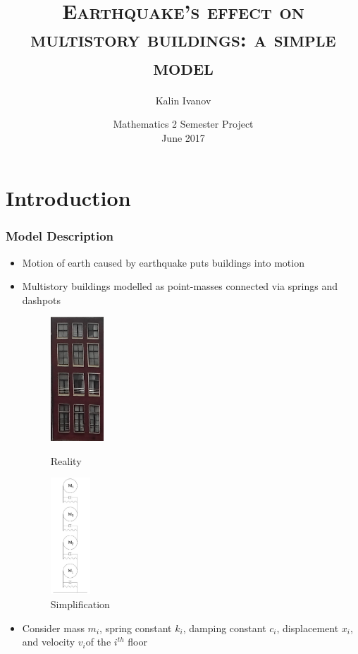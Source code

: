 \documentclass[xcolor=svgnames,9pt]{beamer}
\title[EQ's effect on multistory buildings]
{\textsc{Earthquake's effect on multistory buildings: a simple model}}
\institute[]{\large \textsc{\v{C}VUT FSv}}
\author[Kalin Ivanov]
{Kalin Ivanov}
\date[15 June 2017]
{Mathematics 2 Semester Project
\\
\bigskip
15 June 2017}
\theoremstyle{remark}
\begin{document}
		\begin{frame}
  			\titlepage
		\end{frame}
	\section{Introduction}
		\begin{frame}
			\frametitle{Model Description}
			\begin{itemize}
				\item Motion of earth caused by earthquake puts buildings into motion
				\item Multistory buildings modelled as point-masses connected via springs and dashpots

				\begin{figure}
 				 	\begin{minipage}[b]{0.4\textwidth}
						\centering
    						\includegraphics[width=20mm]{bldg.png}
    						\caption{Reality}
						\label{bldg}
  					\end{minipage}
 					 \hfill
					\begin{minipage}[b]{0.4\textwidth}
						\centering
 				  	 	\includegraphics[width=15mm]{SPRINGS-Model1A.jpg}
    						\caption{Simplification}
						\label{Springs1}
 					 \end{minipage}
				\end{figure}

				\item Consider mass $m_i$, spring constant $k_i$, damping constant $c_i$, displacement $x_i$,  and velocity $v_i$of the $i^{th}$ floor
			\end{itemize}
			\bigskip
		\end{frame}
\end{document}
